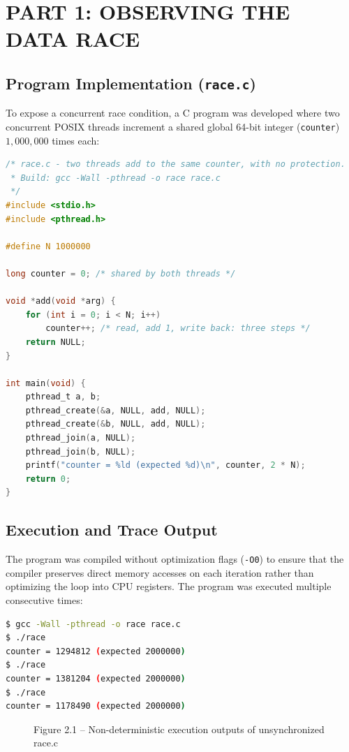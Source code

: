 \documentclass[12pt,a4paper]{report}
\numberwithin{equation}{chapter}
\numberwithin{figure}{chapter}
\numberwithin{table}{chapter}
\begin{document}
\chapter{PART 1: OBSERVING THE DATA RACE}

\section{Program Implementation (\texttt{race.c})}
To expose a concurrent race condition, a C program was developed where two concurrent POSIX threads increment a shared global 64-bit integer (\texttt{counter}) $1{,}000{,}000$ times each:

\begin{lstlisting}[language=C]
/* race.c - two threads add to the same counter, with no protection.
 * Build: gcc -Wall -pthread -o race race.c
 */
#include <stdio.h>
#include <pthread.h>

#define N 1000000

long counter = 0; /* shared by both threads */

void *add(void *arg) {
    for (int i = 0; i < N; i++)
        counter++; /* read, add 1, write back: three steps */
    return NULL;
}

int main(void) {
    pthread_t a, b;
    pthread_create(&a, NULL, add, NULL);
    pthread_create(&b, NULL, add, NULL);
    pthread_join(a, NULL);
    pthread_join(b, NULL);
    printf("counter = %ld (expected %d)\n", counter, 2 * N);
    return 0;
}
\end{lstlisting}

\section{Execution and Trace Output}
The program was compiled without optimization flags (\texttt{-O0}) to ensure that the compiler preserves direct memory accesses on each iteration rather than optimizing the loop into CPU registers. The program was executed multiple consecutive times:

\begin{lstlisting}[language=bash]
$ gcc -Wall -pthread -o race race.c
$ ./race
counter = 1294812 (expected 2000000)
$ ./race
counter = 1381204 (expected 2000000)
$ ./race
counter = 1178490 (expected 2000000)
\end{lstlisting}

\begin{figure}[H]
\centering
\caption{Figure 2.1 -- Non-deterministic execution outputs of unsynchronized race.c}
\end{figure}
\end{document}
